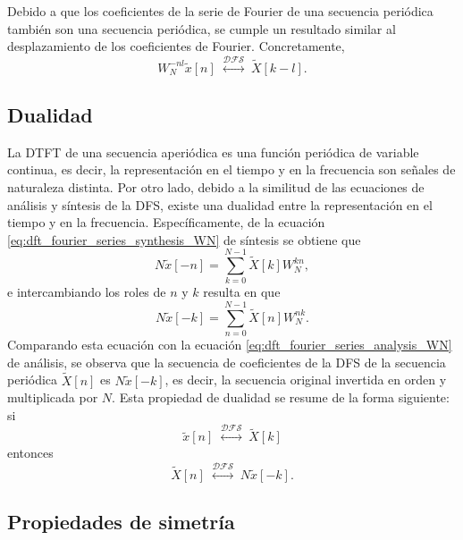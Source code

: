 \documentclass[a4paper]{report}
\begin{document}
Debido a que los coeficientes de la serie de Fourier de una secuencia periódica también son una secuencia periódica, se cumple un resultado similar al desplazamiento de los coeficientes de Fourier. Concretamente,
\begin{equation}\label{eq:dft_dfs_properties_frequency_shift}
 W_N^{-nl}\tilde{x}[n]\;\overset{\mathcal{DFS}}{\longleftrightarrow}\;\tilde{X}[k-l]. 
\end{equation}

\subsection{Dualidad}\label{sec:dft_dfs_properties_duality}

La DTFT de una secuencia aperiódica es una función periódica de variable continua, es decir, la representación en el tiempo y en la frecuencia son señales de naturaleza distinta. Por otro lado, debido a la similitud de las ecuaciones de análisis y síntesis de la DFS, existe una dualidad entre la representación en el tiempo y en la frecuencia. Específicamente, de la ecuación \ref{eq:dft_fourier_series_synthesis_WN} de síntesis se obtiene que 
\[
 N\tilde{x}[-n]=\sum_{k=0}^{N-1}\tilde{X}[k]W_N^{kn}, 
\]
e intercambiando los roles de \(n\) y \(k\) resulta en que 
\[
 N\tilde{x}[-k]=\sum_{n=0}^{N-1}\tilde{X}[n]W_N^{nk}. 
\]
Comparando esta ecuación con la ecuación \ref{eq:dft_fourier_series_analysis_WN} de análisis, se observa que la secuencia de coeficientes de la DFS de la secuencia periódica \(\tilde{X}[n]\) es \(N\tilde{x}[-k]\), es decir, la secuencia original invertida en orden y multiplicada por \(N\). Esta propiedad de dualidad se resume de la forma siguiente: si
\[
 \tilde{x}[n]\;\overset{\mathcal{DFS}}{\longleftrightarrow}\;\tilde{X}[k]
\]
entonces
\[
 \tilde{X}[n]\;\overset{\mathcal{DFS}}{\longleftrightarrow}\;N\tilde{x}[-k].
\]

\subsection{Propiedades de simetría}\label{sec:dft_dfs_properties_symmetry}
\end{document}
